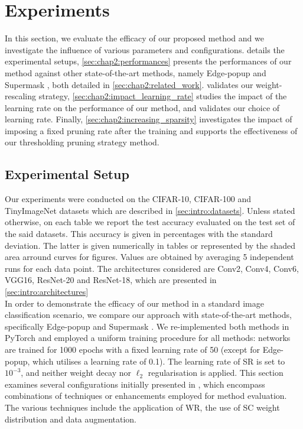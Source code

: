 \section{Experiments}
\label{sec:chap2:experiments}

In this section, we  evaluate the efficacy of our proposed method and we
investigate the influence of various parameters and configurations.
 details the experimental setups,
\cref{sec:chap2:performances} presents the performances of our method against
other state-of-the-art methods, namely Edge-popup
\cite{DBLP:conf/cvpr/RamanujanWKFR20} and Supermask
\cite{DBLP:conf/nips/ZhouLLY19}, both detailed in \cref{sec:chap2:related_work}.
 validates our weight-rescaling
strategy,  \cref{sec:chap2:impact_learning_rate} studies the impact of the
learning rate on the performance of our method, and validates our choice of
learning rate. Finally, \cref{sec:chap2:increasing_sparsity} investigates the
impact of imposing a fixed pruning rate after the training and supports the
effectiveness of our thresholding pruning strategy method.


\subsection{Experimental Setup}
\label{sec:chap2:experimental_setup}

Our experiments were conducted on the CIFAR-10, CIFAR-100 and TinyImageNet
datasets which are described in \cref{sec:intro:datasets}. Unless stated
otherwise, on each table we report the test accuracy evaluated on the test set
of the said datasets. This accuracy is given in percentages with the standard
deviation. The latter is given numerically in tables or represented by the
shaded area arround curves for figures. Values are obtained by averaging 5
independent runs for each data point. The architectures considered are Conv2,
Conv4, Conv6, VGG16, ResNet-20 and ResNet-18, which are presented in
\cref{sec:intro:architectures}\\

In order to demonstrate the efficacy of our method in a standard image
classification scenario, we compare our approach with state-of-the-art methods,
specifically Edge-popup \cite{DBLP:conf/cvpr/RamanujanWKFR20} and Supermask
\cite{DBLP:conf/nips/ZhouLLY19}. We re-implemented both methods in PyTorch
\cite{DBLP:conf/nips/PaszkeGMLBCKLGA19} and employed a uniform training
procedure for all methods: networks are trained for 1000 epochs with a fixed
learning rate of 50 (except for Edge-popup, which utilises a learning rate of
0.1). The learning rate of \ac{SR} is set to $10^{-3}$, and  neither weight
decay nor $\ell_2$ regularisation is applied. This section examines several
configurations initially presented in \cite{DBLP:conf/nips/ZhouLLY19}, which
encompass combinations of techniques or enhancements employed for method
evaluation. The various techniques include the application of \ac{WR}, the use
of \ac{SC} weight distribution
\cite{DBLP:conf/nips/ZhouLLY19,DBLP:conf/cvpr/RamanujanWKFR20} and data
augmentation.\\

